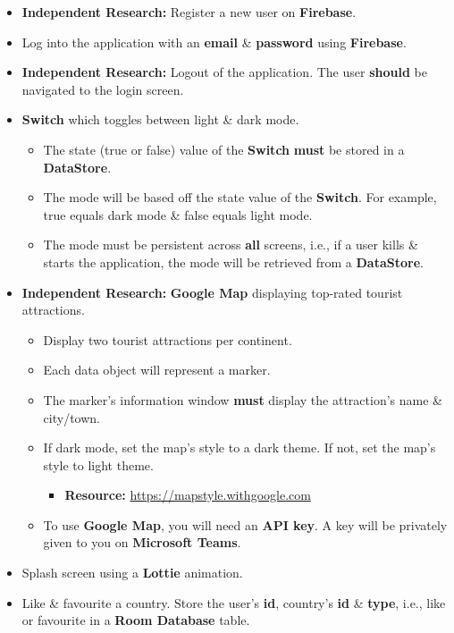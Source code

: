 \documentclass{article}
\begin{document}
\begin{itemize}
	\item \textbf{Independent Research:} Register a new user on \textbf{Firebase}.
	\item Log into the application with an \textbf{email} \& \textbf{password} using \textbf{Firebase}.
	\item \textbf{Independent Research:} Logout of the application. The user \textbf{should} be navigated to the login screen.
	\item \textbf{Switch} which toggles between light \& dark mode.
	      \begin{itemize}
		      \item The state (true or false) value of the \textbf{Switch} \textbf{must} be stored in a \textbf{DataStore}.
		      \item The mode will be based off the state value of the \textbf{Switch}. For example, true equals dark mode \& false equals light mode.
		      \item The mode must be persistent across \textbf{all} screens, i.e., if a user kills \& starts the application, the mode will be retrieved from a \textbf{DataStore}.
	      \end{itemize}
	\item \textbf{Independent Research:} \textbf{Google Map} displaying top-rated tourist attractions.
	      \begin{itemize}
		      \item Display two tourist attractions per continent.
		      \item Each data object will represent a marker.
		      \item The marker's information window \textbf{must} display the attraction's name \& city/town.
		      \item If dark mode, set the map's style to a dark theme. If not, set the map's style to light theme.
		            \begin{itemize}
			            \item \textbf{Resource:} \small\href{https://mapstyle.withgoogle.com}{https://mapstyle.withgoogle.com}
		            \end{itemize}
		      \item To use \textbf{Google Map}, you will need an \textbf{API key}. A key will be privately given to you on \textbf{Microsoft Teams}.
	      \end{itemize}
	\item Splash screen using a \textbf{Lottie} animation.
	\item Like \& favourite a country. Store the user's \textbf{id}, country's \textbf{id} \& \textbf{type}, i.e., like or favourite in a \textbf{Room Database} table.  

\end{itemize}
\end{document}
